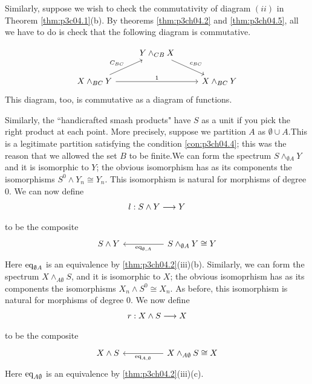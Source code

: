 \documentclass[../main]{subfiles}
\begin{document}
Similarly, suppose we wish to check the commutativity of diagram $(ii)$ in Theorem \ref{thm:p3c04.1}(b). By theorems \ref{thm:p3ch04.2} and \ref{thm:p3ch04.5}, all we have to do is check that the following diagram is commutative.

\[\begin{tikzcd}
& Y\wedge_{CB} X\arrow[rd,"c_{BC}"] & \\
X\wedge_{BC} Y \arrow[ru,"C_{BC}"] \arrow[rr, "1"] && X\wedge_{BC}Y
\end{tikzcd}\]
This diagram, too, is commutative as a diagram of functions.

Similarly, the “handicrafted smash products" have $S$ as a unit if
you pick the right product at each point. More precisely, suppose we
partition $A$ as $\emptyset\cup A$.This is a legitimate partition satisfying the
condition \ref{con:p3ch04.4}; this was the reason that we allowed the set $B$ to be finite.We can form the spectrum $S\wedge_{\emptyset A}Y$ and it is isomorphic to $Y$; the obvious isomorphism has as its components the isomorphisms $S^0\wedge Y_n \cong Y_n$. This isomorphism is natural for morphisms of degree $0$. We can now define \[ l:S\wedge Y\lar{}Y\]
to be the composite \[\begin{tikzcd}
S\wedge Y &&S\wedge_{\emptyset A}Y\cong Y\arrow[ll,"\te{eq}_{\emptyset,A}"]
\end{tikzcd}\]
Here $\mathrm{eq}_{\emptyset A}$ is an equivalence by \ref{thm:p3ch04.2}(iii)(b). Similarly, we can form the spectrum $X\wedge_{A\emptyset} S$, and it is isomorphic to $X$; the obvious isomoprhism has as its components the isomorphisms $X_n\wedge S^0 \cong X_n$. As before, this isomorphism is natural for morphisms of degree $0$. We now define \[ r:X\wedge S\lar{}X\]
to be the composite \[\begin{tikzcd}
X\wedge S &&X\wedge_{A\emptyset }S\cong X\arrow[ll,"\te{eq}_{A,\emptyset}"]
\end{tikzcd} \]
Here $\mathrm{eq}_{A\emptyset}$ is an equivalence by \ref{thm:p3ch04.2}(iii)(c).
\end{document}
